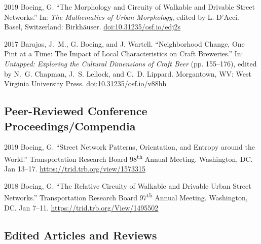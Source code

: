 \documentclass[12pt,letterpaper]{report}
\begin{document}
	\begin{tablist}

		\item[2019] \tab Boeing, G. \enquote{The Morphology and Circuity of Walkable and Drivable Street Networks.} In: \textit{The Mathematics of Urban Morphology}, edited by L. D'Acci. Basel, Switzerland: Birkhäuser. \href{https://doi.org/10.31235/osf.io/edj2s}{doi:10.31235/osf.io/edj2s}

		\item[2017] \tab Barajas, J.~M., G. Boeing, and J. Wartell. \enquote{Neighborhood Change, One Pint at a Time: The Impact of Local Characteristics on Craft Breweries.} In: \textit{Untapped: Exploring the Cultural Dimensions of Craft Beer} (pp. 155--176), edited by N.~G. Chapman, J.~S. Lellock, and C.~D. Lippard. Morgantown, WV: West Virginia University Press. \href{https://doi.org/10.31235/osf.io/v88hh}{doi:10.31235/osf.io/v88hh}

	\end{tablist}



	\subsection*{Peer-Reviewed Conference Proceedings/Compendia}

	\begin{tablist}

		\item[2019] \tab Boeing, G. \enquote{Street Network Patterns, Orientation, and Entropy around the World.} Transportation Research Board 98\textsuperscript{th} Annual Meeting. Washington, DC. Jan 13--17. \href{https://trid.trb.org/view/1573315}{https://trid.trb.org/view/1573315}

		\item[2018] \tab Boeing, G. \enquote{The Relative Circuity of Walkable and Drivable Urban Street Networks.} Transportation Research Board 97\textsuperscript{th} Annual Meeting. Washington, DC. Jan 7--11. \href{https://trid.trb.org/View/1495502}{https://trid.trb.org/View/1495502}

	\end{tablist}



	\subsection*{Edited Articles and Reviews}
\end{document}
